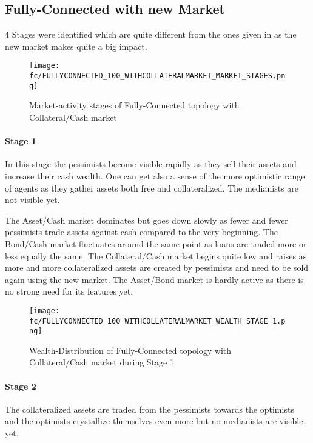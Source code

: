 \documentclass[Bachelorarbeit.tex]{subfiles}
\begin{document}
\subsection{Fully-Connected with new Market}

4 Stages were identified which are quite different from the ones given in \cite{Breuer2015} as the new market makes quite a big impact.

\begin{figure}[H]
	\centering
  \texttt{[image: fc/FULLYCONNECTED\_100\_WITHCOLLATERALMARKET\_MARKET\_STAGES.png]}
  	\caption{Market-activity stages of Fully-Connected topology with Collateral/Cash market}
	\label{fig:markets_FULLYCONNECTED_100_WITHCOLLATERALMARKET_MARKET_STAGES}
\end{figure}

\paragraph{Stage 1}
In this stage the pessimists become visible rapidly as they sell their assets and increase their cash wealth. One can get also a sense of the more optimistic range of agents as they gather assets both free and collateralized. The medianists are not visible yet.

\medskip

The Asset/Cash market dominates but goes down slowly as fewer and fewer pessimists trade assets against cash compared to the very beginning. 
The Bond/Cash market fluctuates around the same point as loans are traded more or less equally the same.
The Collateral/Cash market begins quite low and raises as more and more collateralized assets are created by pessimists and need to be sold again using the new market.
The Asset/Bond market is hardly active as there is no strong need for its features yet.

\begin{figure}[H]
	\centering
  \texttt{[image: fc/FULLYCONNECTED\_100\_WITHCOLLATERALMARKET\_WEALTH\_STAGE\_1.png]}
  	\caption{Wealth-Distribution of Fully-Connected topology with Collateral/Cash market during Stage 1}
	\label{fig:markets_FULLYCONNECTED_100_WITHCOLLATERALMARKET_WEALTH_STAGE_1}
\end{figure}

\paragraph{Stage 2}
The collateralized assets are traded from the pessimists towards the optimists and the optimists crystallize themselves even more but no medianists are visible yet.
\end{document}
